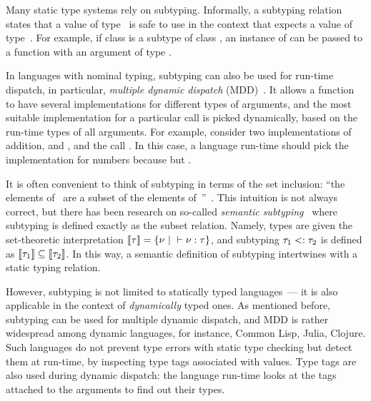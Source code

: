 Many static type systems rely on subtyping.
Informally, a subtyping relation  states that
a value of type~ is safe to use 
in the context that expects a value of type~.
For example, if class  is a subtype of class ,
an instance of  can be passed to a function
with an argument of type .

In languages with nominal typing, subtyping can also be used for run-time
dispatch, in particular, \emph{multiple dynamic dispatch} 
(MDD)~\cite{bib:Chambers:1992:Cecil,bib:Clifton:2000:MultiJava}.
It allows a function to have several implementations 
for different types of arguments,
and the most suitable implementation for a particular call 
is picked dynamically, based on the run-time types of all arguments.
For example, consider two implementations of addition,
 and ,
and the call .
In this case, a language run-time should pick 
the implementation for numbers 
because  but .

It is often convenient to think of subtyping 
in terms of the set inclusion: ``the elements of~ are a subset
of the elements of~''~\cite{bib:Pierce:2002:TAPL}.
This intuition is not always correct, but there has been research on
so-called \emph{semantic subtyping}~\cite{bib:Hosoya:2003:XDuce,
  bib:Frisch:2008:sem-sub, bib:Ancona:2016:sem-sub-oo} 
where subtyping is defined exactly as the subset relation. %
Namely, types are given the set-theoretic interpretation
$\llbracket \tau \rrbracket = \{\nu ~\vert~ \vdash \nu : \tau \}$, 
and subtyping $\tau_1 <: \tau_2$ is defined 
as $\llbracket \tau_1 \rrbracket \subseteq \llbracket \tau_2 \rrbracket$.
In this way, a semantic definition of subtyping intertwines with 
a static typing relation.

However, subtyping is not limited to statically typed languages~---
it is also applicable in the context of \emph{dynamically} typed ones.
As mentioned before, subtyping can be used for multiple dynamic dispatch,
and MDD is rather widespread among dynamic languages, for instance,
Common Lisp, Julia, Clojure.
Such languages do not prevent type errors with static type checking
but detect them at run-time, by inspecting type tags associated with values.
Type tags are also used during dynamic dispatch: 
the language run-time looks at the tags attached to the arguments
to find out their types.

